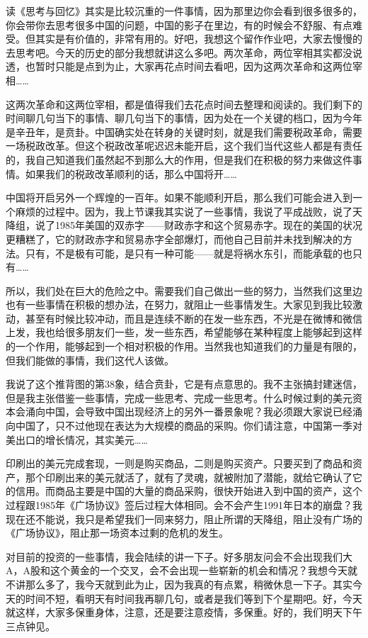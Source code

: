 \documentclass[UTF8, 12pt, a4paper]{ctexrep}
\begin{document}
读《思考与回忆》其实是比较沉重的一件事情，因为那里边你会看到很多很多的，你会带你去思考很多中国的问题，中国的影子在里边，有的时候会不舒服、有点难受。但其实是有价值的，非常有用的。好吧，我想这个留作作业吧，大家去慢慢的去思考吧。今天的历史的部分我想就讲这么多吧。两次革命，两位宰相其实都没说透，也暂时只能是点到为止，大家再花点时间去看吧，因为这两次革命和这两位宰相……

这两次革命和这两位宰相，都是值得我们去花点时间去整理和阅读的。我们剩下的时间聊几句当下的事情、聊几句当下的事情，因为处在一个关键的档口，因为今年是辛丑年，是贲卦。中国确实处在转身的关键时刻，就是我们需要税政革命，需要一场税政改革。但这个税政改革呢迟迟未能开启，这个我们当代这些人都是有责任的，我自己知道我们虽然起不到那么大的作用，但是我们在积极的努力来做这件事情。如果我们的税政改革顺利的话，那么中国将开……

中国将开启另外一个辉煌的一百年。如果不能顺利开启，那么我们可能会进入到一个麻烦的过程中。因为，我上节课我其实说了一些事情，我说了平成战败，说了天降组，说了1985年美国的双赤字——财政赤字和这个贸易赤字。现在的美国的状况更糟糕了，它的财政赤字和贸易赤字全部爆灯，而他自己目前并未找到解决的方法。只有，不是极有可能，是只有一种可能——就是将祸水东引，而能承载的也只有……

所以，我们处在巨大的危险之中。需要我们自己做出一些的努力，当然我们这里边也有一些事情在积极的想办法，在努力，就阻止一些事情发生。大家见到我比较激动，甚至有时候比较冲动，而且是连续不断的在发一些东西，不光是在微博和微信上发，我也给很多朋友们一些，发一些东西，希望能够在某种程度上能够起到这样的一个作用，能够起到一个相对积极的作用。当然我也知道我们的力量是有限的，但我们能做的事情，我们这代人该做。

我说了这个推背图的第38象，结合贲卦，它是有点意思的。我不主张搞封建迷信，但是我主张借鉴一些事情，完成一些思考、完成一些思考。什么时候过剩的美元资本会涌向中国，会导致中国出现经济上的另外一番景象呢？我必须跟大家说已经涌向中国了，只不过他现在表达为大规模的商品的采购。你们请注意，中国第一季对美出口的增长情况，其实美元……

印刷出的美元完成套现，一则是购买商品，二则是购买资产。只要买到了商品和资产，那个印刷出来的美元就活了，就有了灵魂，就被附加了潜能，就给它确认了它的信用。而商品主要是中国的大量的商品采购，很快开始进入到中国的资产，这个过程跟1985年《广场协议》签后过程大体相同。会不会产生1991年日本的崩盘？我现在还不能说，我只是希望我们一同来努力，阻止所谓的天降组，阻止没有广场的《广场协议》，阻止那一场资本过剩的危机的发生。

对目前的投资的一些事情，我会陆续的讲一下子。好多朋友问会不会出现我们大A，A股和这个黄金的一个交叉，会不会出现一些崭新的机会和情况？我想今天就不讲那么多了，我今天就到此为止，因为我真的有点累，稍微休息一下子。其实今天的时间不短，看明天有时间我再聊几句，或者是我们等到下个星期吧。好，今天就这样，大家多保重身体，注意，还是要注意疫情，多保重。好的，我们明天下午三点钟见。
\end{document}
